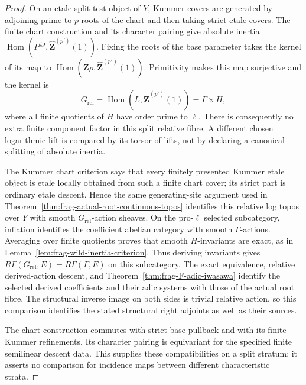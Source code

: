 \documentclass[11pt]{article}
\theoremstyle{definition}
\theoremstyle{remark}
\begin{document}
\begin{proof}
On an etale split test object of $Y$, Kummer covers are generated by
adjoining prime-to-$p$ roots of the chart and then taking strict etale
covers.  The finite chart construction and its character pairing give
absolute inertia $\operatorname{Hom}(P^{\mathrm{gp}},\widehat{\mathbf Z}^{(p')}(1))$.
Fixing the roots of the base parameter takes the kernel of its map to
$\operatorname{Hom}(\mathbf Z\rho,\widehat{\mathbf Z}^{(p')}(1))$.
Primitivity makes this map surjective and the kernel is
\[
 G_{\mathrm{rel}}=\operatorname{Hom}(L,\widehat{\mathbf Z}^{(p')}(1))
                  =\Gamma\times H,
\]
where all finite quotients of $H$ have order prime to $\ell$.
There is consequently no extra finite component factor in this split
relative fibre.  A different chosen logarithmic lift is compared by
its torsor of lifts, not by declaring a canonical splitting of absolute
inertia.

The Kummer chart criterion says that every finitely presented Kummer
etale object is etale locally obtained from such a finite chart cover;
its strict part is ordinary etale descent.  Hence the same generating-site
argument used in Theorem~\ref{thm:frag-actual-root-continuous-topos}
identifies this relative log topos over $Y$ with smooth
$G_{\mathrm{rel}}$-action sheaves.  On the pro-$\ell$ selected subcategory,
inflation identifies the coefficient abelian category with smooth
$\Gamma$-actions.  Averaging over finite quotients proves that smooth
$H$-invariants are exact, as in Lemma~\ref{lem:frag-wild-inertia-criterion}.
Thus deriving invariants gives
$R\Gamma(G_{\mathrm{rel}},E)=R\Gamma(\Gamma,E)$ on this subcategory.
The exact equivalence, relative derived-action descent, and Theorem~\ref{thm:frag-F-adic-iwasawa}
identify the selected derived coefficients and their adic systems with
those of the actual root fibre.  The structural inverse image on both
sides is trivial relative action, so this comparison identifies the
stated structural right adjoints as well as their sources.

The chart construction commutes with strict base pullback and with
its finite Kummer refinements.  Its character pairing is equivariant
for the specified finite semilinear descent data.  This supplies these
compatibilities on a split stratum; it asserts no comparison for
incidence maps between different characteristic strata.
\end{proof}
\end{document}
